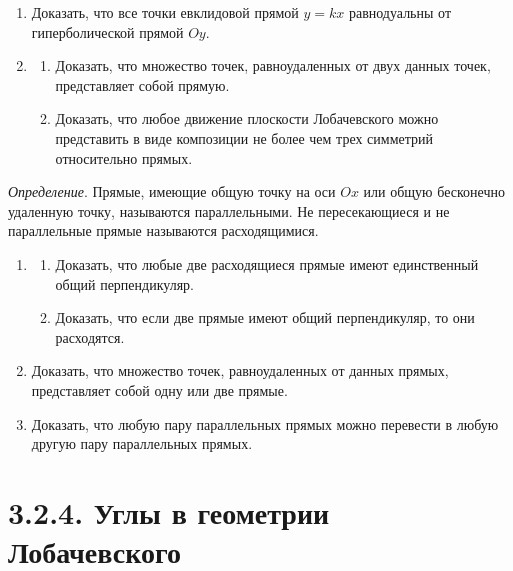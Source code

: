 \begin{enumerate}[resume*]
		\item Доказать, что все точки евклидовой прямой $y = kx$ равнодуальны от гиперболической прямой $Oy$.

		\item
		\begin{enumerate}
			\item Доказать, что множество точек, равноудаленных от двух данных точек, представляет собой прямую.

			\item Доказать, что любое движение плоскости Лобачевского можно представить в виде композиции не более чем трех симметрий относительно прямых.
		\end{enumerate}
	\end{enumerate}
	\textit{Определение}. Прямые, имеющие общую точку на оси $Ox$ или общую бесконечно удаленную точку, называются параллельными. Не пересекающиеся и не параллельные прямые называются расходящимися.
	\begin{enumerate}[resume*]
		\item 
		\begin{enumerate}
			\item Доказать, что любые две расходящиеся прямые имеют единственный общий перпендикуляр.

			\item Доказать, что если две прямые имеют общий перпендикуляр, то они расходятся.
		\end{enumerate}
		\item Доказать, что множество точек, равноудаленных от данных прямых, представляет собой одну или две прямые.
		\item Доказать, что любую пару параллельных прямых можно перевести в любую другую пару параллельных прямых.
	\end{enumerate}
	\section{3.2.4. Углы в геометрии Лобачевского}
	
